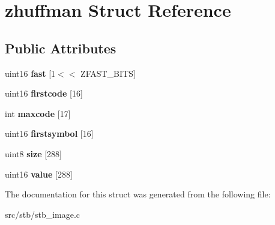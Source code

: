\hypertarget{structzhuffman}{}\section{zhuffman Struct Reference}
\label{structzhuffman}
\subsection*{Public Attributes}
\begin{DoxyCompactItemize}
\item 
\mbox{\label{structzhuffman_a12d5f92a121b65680e5f0b4027d00c96}} 
uint16 {\bfseries fast} \mbox{[}1$<$$<$ Z\+F\+A\+S\+T\+\_\+\+B\+I\+TS\mbox{]}
\item 
\mbox{\label{structzhuffman_a81f5ae5bd31b40439955de6154572917}} 
uint16 {\bfseries firstcode} \mbox{[}16\mbox{]}
\item 
\mbox{\label{structzhuffman_ac7dd4a2bf01a6e27933dd1cf6b0cc762}} 
int {\bfseries maxcode} \mbox{[}17\mbox{]}
\item 
\mbox{\label{structzhuffman_afbdb21fd99f413fc8f9e58243552fe95}} 
uint16 {\bfseries firstsymbol} \mbox{[}16\mbox{]}
\item 
\mbox{\label{structzhuffman_a46ce4d4a4d7fc41c2560616f6696e9b9}} 
uint8 {\bfseries size} \mbox{[}288\mbox{]}
\item 
\mbox{\label{structzhuffman_acc395b638b700b944c329d71a8b82084}} 
uint16 {\bfseries value} \mbox{[}288\mbox{]}
\end{DoxyCompactItemize}


The documentation for this struct was generated from the following file\+:\begin{DoxyCompactItemize}
\item 
src/stb/stb\+\_\+image.\+c\end{DoxyCompactItemize}
